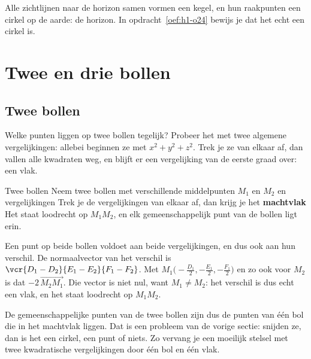 Alle zichtlijnen naar de horizon samen vormen een kegel, en hun raakpunten een cirkel op de aarde: de horizon. In opdracht~\ref{oef:h1-o24} bewijs je dat het echt een cirkel is.

\begin{oefeningen}
\end{oefeningen}

\section{Twee en drie bollen}

\subsection{Twee bollen}

Welke punten liggen op twee bollen tegelijk? Probeer het met twee algemene vergelijkingen: allebei beginnen ze met $x^2 + y^2 + z^2$. Trek je ze van elkaar af, dan vallen alle kwadraten weg, en blijft er een vergelijking van de eerste graad over: een vlak.

\begin{theorie}
\begin{stelling}{Twee bollen}
Neem twee bollen met verschillende middelpunten $M_1$ en $M_2$ en vergelijkingen
Trek je de vergelijkingen van elkaar af, dan krijg je het \textbf{\textcolor{accent}{machtvlak}}
Het staat loodrecht op $M_1M_2$, en elk gemeenschappelijk punt van de bollen ligt erin.
\end{stelling}

\begin{bewijs}
Een punt op beide bollen voldoet aan beide vergelijkingen, en dus ook aan hun verschil. De normaalvector van het verschil is $\vcr{D_1 - D_2}{E_1 - E_2}{F_1 - F_2}$. Met $M_1\bigl(-\tfrac{D_1}{2}, -\tfrac{E_1}{2}, -\tfrac{F_1}{2}\bigr)$ en zo ook voor $M_2$ is dat $-2\,\overrightarrow{M_2M_1}$. Die vector is niet nul, want $M_1 \neq M_2$: het verschil is dus echt een vlak, en het staat loodrecht op $M_1M_2$.
\end{bewijs}
\end{theorie}

De gemeenschappelijke punten van de twee bollen zijn dus de punten van één bol die in het machtvlak liggen. Dat is een probleem van de vorige sectie: snijden ze, dan is het een cirkel, een punt of niets. Zo vervang je een moeilijk stelsel met twee kwadratische vergelijkingen door één bol en één vlak.

